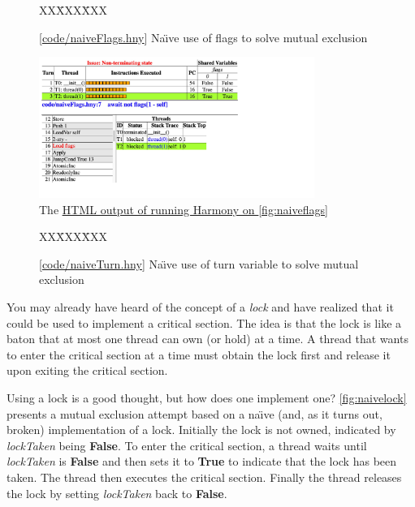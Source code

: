 \documentclass{report}
\newcommand{\harmonysource}[1]{
\begin{tabbing}
XX\=XXX\=XXX\kill
    
\end{tabbing}
}
\newcommand{\harmonylink}[1]{%
[\href{https://harmony.cs.cornell.edu/#1}{\underline{#1}}]%
}
\newcommand{\harmonyref}[2]{%
\href{https://harmony.cs.cornell.edu/output/#1}{\underline{#2}}%
}
\newenvironment{code}{
\tcolorbox
}{
\endtcolorbox
}
\begin{document}
\begin{figure}
\begin{code}
\harmonysource{naiveFlags}
\end{code}
\caption{\harmonylink{code/naiveFlags.hny} Na\"{\i}ve use of flags to solve mutual exclusion}
\label{fig:naiveflags}
\end{figure}

\begin{figure}
\begin{center}
\includegraphics[width=0.8\textwidth]{figures/naiveFlags.pdf}
\end{center}
\caption{The \harmonyref{naiveFlags.html}{HTML output of running Harmony on \autoref{fig:naiveflags}}}
\label{fig:naiveflagshtml}
\end{figure}

\begin{figure}
\begin{code}
\harmonysource{naiveTurn}
\end{code}
\caption{\harmonylink{code/naiveTurn.hny} Na\"{\i}ve use of turn variable to solve mutual exclusion}
\label{fig:naiveturn}
\end{figure}

%

You may already have heard of the concept of a \emph{lock}
%
and have realized that
it could be used to implement a critical section.
The idea is that the lock is like a baton that at most one thread can own
(or hold) at a time.
A thread that wants to enter the critical section at a time must obtain the
lock first and release it upon exiting the critical section.

Using a lock is a good thought, but how does one implement one?
\autoref{fig:naivelock} presents a mutual exclusion attempt based on a
na\"{\i}ve (and, as it turns out, broken) implementation of a lock.
Initially the lock is not owned, indicated by \textit{lockTaken} being \textbf{False}.
To enter the critical section, a thread waits until \textit{lockTaken} is \textbf{False}
and then sets it to \textbf{True} to indicate that the lock has been taken.
The thread then executes the critical section.  Finally the thread
releases the lock by setting \textit{lockTaken} back to \textbf{False}.
\end{document}
